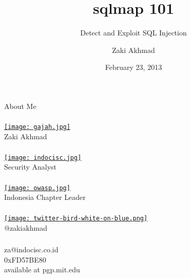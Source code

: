 \documentclass[xcolor=pdftex,table,10pt]{beamer}
\begin{document}
\title{sqlmap 101}
\subtitle{Detect and Exploit SQL Injection}
\author{Zaki Akhmad}
\date{February 23, 2013}

\begin{frame}
	\titlepage
\end{frame}

\begin{frame}
	\frametitle{}
	\begin{center}
		\LARGE{About Me}
	\end{center}
\end{frame}

\begin{frame}
	\frametitle{}
	\begin{center}
		\href{http://instagram.com/p/T5PWd1SX3o/}{\texttt{[image: gajah.jpg]}} \\
		Zaki Akhmad
	\end{center}
\end{frame}

\begin{frame}
	\frametitle{}
	\begin{center}
		\href{http://www.indocisc.or.id}{\texttt{[image: indocisc.jpg]}} \\
		Security Analyst
	\end{center}
\end{frame}

\begin{frame}
	\frametitle{}
	\begin{center}
		\href{http://owasp.or.id}{\texttt{[image: owasp.jpg]}} \\
		Indonesia Chapter Leader \\
	\end{center}
\end{frame}

\begin{frame}
	\frametitle{}
	\begin{center}
		\href{https://twitter.com/zakiakhmad}{\texttt{[image: twitter-bird-white-on-blue.png]}} \\
		@zakiakhmad \\
	\end{center}
\end{frame}

\begin{frame}
	\frametitle{}
	\begin{center}
		za@indocisc.co.id \\
		0xFD57BE80 \\
		available at pgp.mit.edu \\
	\end{center}
\end{frame}
\end{document}

